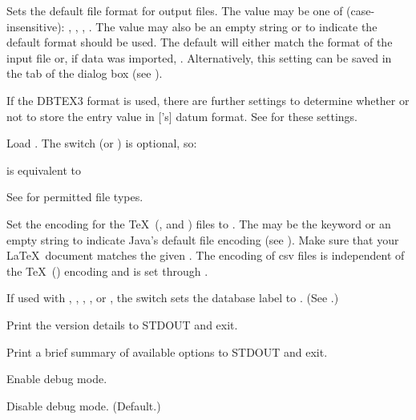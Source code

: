 Sets the default file format for output files. The value may be one
of (case-insensitive): , , 
, . The value may also be an empty
string or  to indicate the default format should be
used. The default will either match the format of the input file or,
if data was imported, . Alternatively, this setting
can be saved in the  tab of the 
dialog box (see ).

\begin{information}
If the \gls{DBTEX3} format is used, there are further settings to
determine whether or not to store the entry value in
['s] datum format. See
 for these settings.
\end{information}

Load . The switch 
(or ) is optional, so:
\begin{terminal}
 
\end{terminal}
is equivalent to 
\begin{terminal}
  
\end{terminal}
See  for permitted file types.

Set the encoding for the \TeX\ (,  and
) files to . The  may be
the keyword  or an empty string to indicate Java's
default file encoding (see ). Make sure that
your \LaTeX\ document matches the given . The
encoding of \gls{csv} files is independent of the \TeX\
() encoding and is set through .

If used with , , , , 
or \switch{probsoln}, the \switch{name} switch sets the database label to 
\meta{name}. (See \sectionref{sec:fileext}.)

Print the version details to STDOUT and exit.

Print a brief summary of available options to STDOUT and exit.

Enable debug mode.

Disable debug mode. (Default.)

